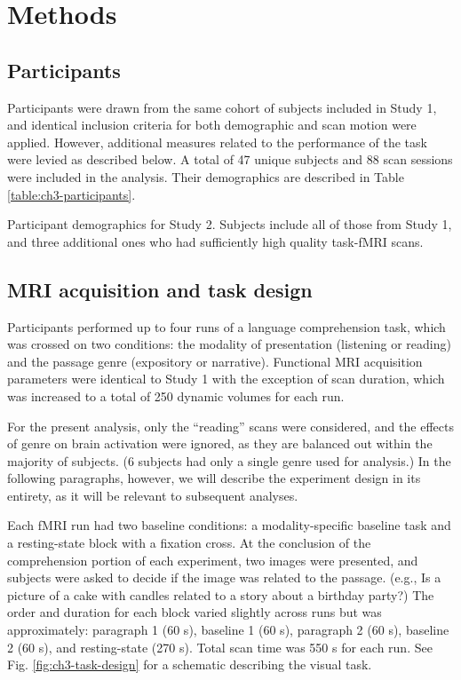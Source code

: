 \section{Methods}

\subsection{Participants}

Participants were drawn from the same cohort of subjects included in Study 1, and identical inclusion criteria for both demographic and scan motion were applied. However, additional measures related to the performance of the task were levied as described below. A total of 47 unique subjects and 88 scan sessions were included in the analysis. Their demographics are described in Table \ref{table:ch3-participants}.

\begin{table}
	\renewcommand{\tabcolsep}{0.09cm}
	\centering
	
	\caption[Participant demographics for Study 2]{Participant demographics for Study 2. Subjects include all of those from Study 1, and three additional ones who had sufficiently high quality task-fMRI scans.}
	\label{table:ch3-participants}
\end{table}


\subsection{MRI acquisition and task design}

Participants performed up to four runs of a language comprehension task, which was crossed on two conditions: the modality of presentation (listening or reading) and the passage genre (expository or narrative). Functional MRI acquisition parameters were identical to Study 1 with the exception of scan duration, which was increased to a total of 250 dynamic volumes for each run. 

For the present analysis, only the ``reading'' scans were considered, and the effects of genre on brain activation were ignored, as they are balanced out within the majority of subjects. (6 subjects had only a single genre used for analysis.) In the following paragraphs, however, we will describe the experiment design in its entirety, as it will be relevant to subsequent analyses.

Each fMRI run had two baseline conditions: a modality-specific baseline task and a resting-state block with a fixation cross. At the conclusion of the comprehension portion of each experiment, two images were presented, and subjects were asked to decide if the image was related to the passage. (e.g., Is a picture of a cake with candles related to a story about a birthday party?) The order and duration for each block varied slightly across runs but was approximately: paragraph 1 (60 s), baseline 1 (60 s), paragraph 2 (60 s), baseline 2 (60 s), and resting-state (270 s). Total scan time was 550 s for each run. See Fig. \ref{fig:ch3-task-design} for a schematic describing the visual task.

